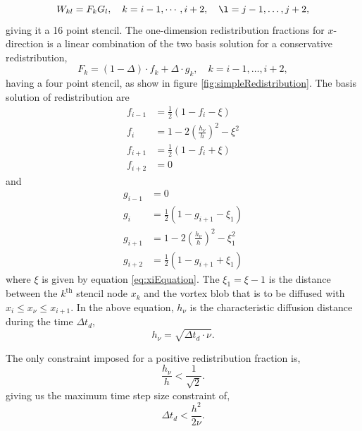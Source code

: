 	\begin{equation}
	W_{kl} = F_k G_l, \quad k = i-1,\cdots,i+2, \quad \l = j-1,\dots,j+2,
	\end{equation}
giving it a 16 point stencil. The one-dimension redistribution fractions for $x$-direction is a linear combination of the two basis solution for a conservative redistribution,
	\begin{equation}
	F_k = \left(1-\Delta\right)\cdot f_k + \Delta\cdot g_k, \quad k = i-1,\dots,i+2,
	\end{equation}
having a four point stencil, as show in figure \ref{fig:simpleRedistribution}. The basis solution of redistribution are 
	\begin{subequations}
	\begin{align}
	f_{i-1} &= \frac{1}{2}\left(1-f_i-\xi\right)\\
	f_i &= 1 - 2\left(\frac{h_{\nu}}{h}\right)^2 - \xi^2\\
	f_{i+1} &= \frac{1}{2}\left(1-f_i+\xi\right)\\
	f_{i+2} &= 0
	\end{align}
	\end{subequations}
and 	
	\begin{subequations}
	\begin{align}
	g_{i-1} &= 0\\
	g_{i} &= \frac{1}{2}\left(1-g_{i+1}-\xi_1\right)\\
	g_{i+1} &= 1 - 2\left(\frac{h_{\nu}}{h}\right)^2 - \xi_1^2\\
	g_{i+2} &= \frac{1}{2}\left(1-g_{i+1}+\xi_1\right)
	\end{align}
	\end{subequations}
where $\xi$ is given by equation \ref{eq:xiEquation}. The $\xi_1 = \xi - 1$ is the distance between the $k^{\mathrm{th}}$ stencil node $x_k$ and the vortex blob that is to be diffused with $x_i \le x_{\nu} \le x_{i+1}$. In the above equation, $h_{\nu}$ is the characteristic diffusion distance during the time $\Delta t_d$, 
	\begin{equation}
	h_{\nu} = \sqrt{\Delta t_d \cdot \nu}.
	\end{equation}
		
The only constraint imposed for a positive redistribution fraction is,
	\begin{equation}
	\frac{h_{\nu}}{h} < \frac{1}{\sqrt{2}}.
	\end{equation}
giving us the maximum time step size constraint of,
	\begin{equation}
	\Delta t_d < \frac{h^2}{2\nu}.
	\end{equation}
	
